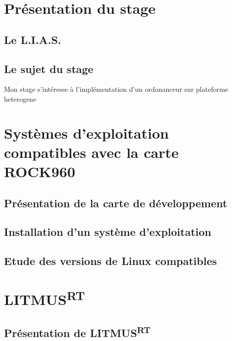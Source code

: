 \documentclass{article}
\newcommand{\litmus}{LITMUS\textsuperscript{RT}}
\begin{document}
    \section*{Présentation du stage}
    
    
    \subsection{Le L.I.A.S.}
    \subsection{Le sujet du stage}
    
    Mon stage s'intéresse à l'implémentation d'un ordonanceur sur \gls{plateforme heterogene}\cite{bertout2020workload}

    \newpage
    \section{Systèmes d'exploitation compatibles avec la carte ROCK960}
    \subsection{Présentation de la carte de développement}
    

    \subsection{Installation d'un système d'exploitation}
    

    \subsection{Etude des versions de Linux compatibles}
    

    


    
    \newpage
    \section{\litmus}
    
    \subsection{Présentation de \litmus}
    
\end{document}
